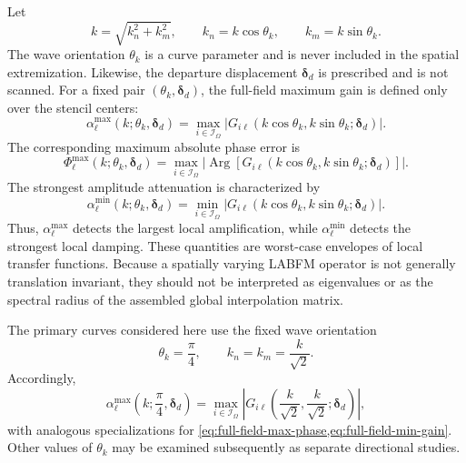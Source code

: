 \documentclass[11pt]{article}
\numberwithin{equation}{section}
\DeclareMathOperator{\Arg}{Arg}
\begin{document}
Let
\begin{equation}
    k=\sqrt{k_n^2+k_m^2},
    \qquad
    k_n=k\cos\theta_k,
    \qquad
    k_m=k\sin\theta_k.
    \label{eq:directional-wavenumber}
\end{equation}
The wave orientation $\theta_k$ is a curve parameter and is never included in the spatial extremization. Likewise, the departure displacement $\bm{\delta}_d$ is prescribed and is not scanned. For a fixed pair $(\theta_k,\bm{\delta}_d)$, the full-field maximum gain is defined only over the stencil centers:
\begin{equation}
    \boxed{
    \alpha_{\ell}^{\max}
    \!\left(k;\theta_k,\bm{\delta}_d\right)
    =
    \max_{i\in\mathcal I_{\Omega}}
    \left|
        G_{i\ell}\!\left(
            k\cos\theta_k,
            k\sin\theta_k;
            \bm{\delta}_d
        \right)
    \right|.
    }
    \label{eq:full-field-max-gain}
\end{equation}
The corresponding maximum absolute phase error is
\begin{equation}
    \boxed{
    \Phi_{\ell}^{\max}
    \!\left(k;\theta_k,\bm{\delta}_d\right)
    =
    \max_{i\in\mathcal I_{\Omega}}
    \left|
        \Arg\!\left[
            G_{i\ell}\!\left(
                k\cos\theta_k,
                k\sin\theta_k;
                \bm{\delta}_d
            \right)
        \right]
    \right|.
    }
    \label{eq:full-field-max-phase}
\end{equation}
The strongest amplitude attenuation is characterized by
\begin{equation}
    \boxed{
    \alpha_{\ell}^{\min}
    \!\left(k;\theta_k,\bm{\delta}_d\right)
    =
    \min_{i\in\mathcal I_{\Omega}}
    \left|
        G_{i\ell}\!\left(
            k\cos\theta_k,
            k\sin\theta_k;
            \bm{\delta}_d
        \right)
    \right|.
    }
    \label{eq:full-field-min-gain}
\end{equation}
Thus, $\alpha_{\ell}^{\max}$ detects the largest local amplification, while $\alpha_{\ell}^{\min}$ detects the strongest local damping. These quantities are worst-case envelopes of local transfer functions. Because a spatially varying LABFM operator is not generally translation invariant, they should not be interpreted as eigenvalues or as the spectral radius of the assembled global interpolation matrix.

The primary curves considered here use the fixed wave orientation
\begin{equation}
    \boxed{
    \theta_k=\frac{\pi}{4},
    \qquad
    k_n=k_m=\frac{k}{\sqrt{2}}.
    }
    \label{eq:primary-angle}
\end{equation}
Accordingly,
\begin{equation}
    \alpha_{\ell}^{\max}
    \!\left(k;\frac{\pi}{4},\bm{\delta}_d\right)
    =
    \max_{i\in\mathcal I_{\Omega}}
    \left|
        G_{i\ell}\!\left(
            \frac{k}{\sqrt{2}},
            \frac{k}{\sqrt{2}};
            \bm{\delta}_d
        \right)
    \right|,
    \label{eq:primary-max-gain}
\end{equation}
with analogous specializations for \cref{eq:full-field-max-phase,eq:full-field-min-gain}. Other values of $\theta_k$ may be examined subsequently as separate directional studies.
\end{document}
